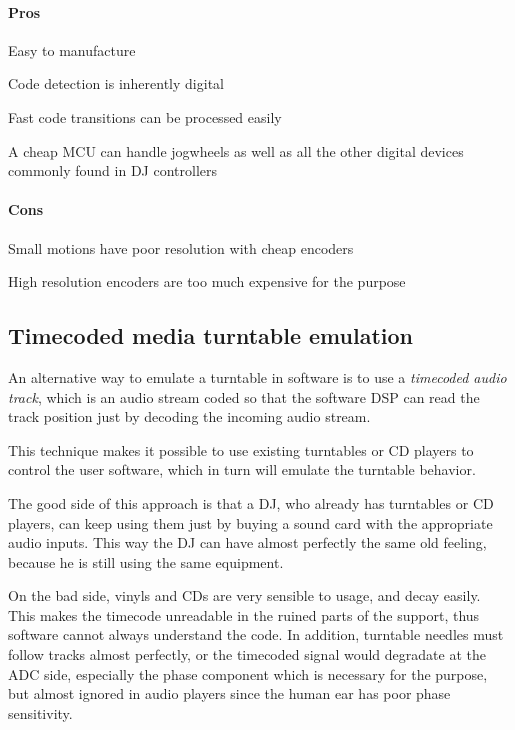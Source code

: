 \documentclass[a4paper,10pt]{article}
\begin{document}
\begin{multicols}{2}
\paragraph{Pros}
\begin{itemize*}
	\item Easy to manufacture
	\item Code detection is inherently digital
	\item Fast code transitions can be processed easily
	\item A cheap MCU can handle jogwheels as well as all the other digital devices
		commonly found in DJ controllers
\end{itemize*}


\paragraph{Cons}
\begin{itemize*}
	\item Small motions have poor resolution with cheap encoders
	\item High resolution encoders are too much expensive for the purpose
\end{itemize*}


\subsection{Timecoded media turntable emulation}

An alternative way to emulate a turntable in software is to use a \emph{timecoded audio track},
which is an audio stream coded so that the software DSP can read the track position just
by decoding the incoming audio stream.

This technique makes it possible to use existing turntables or CD players to control the
user software, which in turn will emulate the turntable behavior.

The good side of this approach is that a DJ, who already has turntables or CD players,
can keep using them just by buying a sound card with the appropriate audio inputs.
This way the DJ can have almost perfectly the same old feeling, because he is still
using the same equipment.

On the bad side, vinyls and CDs are very sensible to usage, and decay easily. This
makes the timecode unreadable in the ruined parts of the support, thus software cannot always
understand the code. In addition, turntable needles must follow tracks almost perfectly,
or the timecoded signal would degradate at the ADC side, especially the phase component
which is necessary for the purpose, but almost ignored in audio players since the human
ear has poor phase sensitivity.


\end{multicols}
\end{document}
